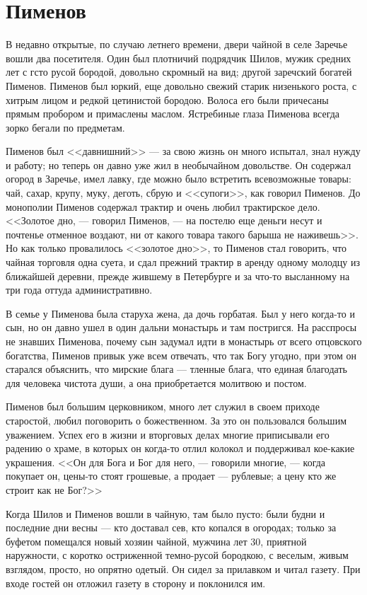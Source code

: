 \section{Пименов}

В недавно открытые, по случаю летнего времени, двери чайной в селе Заречье вошли два посетителя. Один был плотничий подрядчик Шилов, мужик средних лет с гсто русой бородой, довольно скромный на вид; другой заречский богатей Пименов. Пименов был юркий, еще довольно свежий старик низенького роста, с хитрым лицом и редкой цетинистой бородою. Волоса его были причесаны прямым пробором и примаслены маслом. Ястребиные глаза Пименова всегда зорко бегали по предметам.

Пименов был <<давнишний>> --- за свою жизнь он много испытал, знал нужду и работу; но теперь он давно уже жил в необычайном довольстве. Он содержал огород в Заречье, имел лавку, где можно было встретить всевозможные товары: чай, сахар, крупу, муку, деготь, сбрую и <<супоги>>, как говорил Пименов. До монополии Пименов содержал трактир и очень любил трактирское дело. <<Золотое дно, --- говорил Пименов, --- на постелю еще деньги несут и почтенье отменное воздают, ни от какого товара такого барыша не наживешь>>. Но как только провалилось <<золотое дно>>, то Пименов стал говорить, что чайная торговля одна суета, и сдал прежний трактир в аренду одному молодцу из ближайшей деревни, прежде жившему в Петербурге и за что-то высланному на три года оттуда административно.

В семье у Пименова была старуха жена, да дочь горбатая. Был у него когда-то и сын, но он давно ушел в один дальни монастырь и там постригся. На расспросы не знавших Пименова, почему сын задумал идти в монастырь от всего отцовского богатства, Пименов привык уже всем отвечать, что так Богу угодно, при этом он старался объяснить, что мирские блага --- тленные блага, что единая благодать для человека чистота души, а она приобретается молитвою и постом.

Пименов был большим церковником, много лет служил в своем приходе старостой, любил поговорить о божественном. За это он пользовался большим уважением. Успех его в жизни и вторговых делах многие приписывали его радению о храме, в которых он когда-то отлил колокол и поддерживал кое-какие украшения. <<Он для Бога и Бог для него, --- говорили многие, --- когда покупает он, цены-то стоят грошевые, а продает --- рублевые; а цену кто же строит как не Бог?>>

Когда Шилов и Пименов вошли в чайную, там было пусто: были будни и последние дни весны --- кто доставал сев, кто копался в огородах; только за буфетом помещался новый хозяин чайной, мужчина лет 30, приятной наружности, с коротко остриженной темно-русой бородкою, с веселым, живым взглядом, просто, но опрятно одетый. Он сидел за прилавком и читал газету. При входе гостей он отложил газету в сторону и поклонился им.

